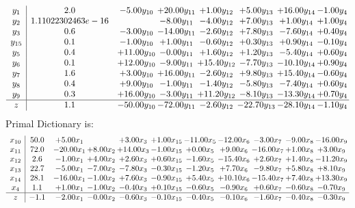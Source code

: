 \documentclass[9pt]{article}
\begin{document}
\[\begin{array}{c| c c@{\hskip 2pt} c@{\hskip 2pt} c@{\hskip 2pt} c@{\hskip 2pt} c@{\hskip 2pt} c@{\hskip 2pt} }
 y_{1}   &  2.0 & -5.00 y_{10} & + 20.00 y_{11} & +  1.00 y_{12} & +  5.00 y_{13} & + 16.00 y_{14} & -1.00 y_{4}\\
 y_{2}   &  1.11022302463e-16  &   & -8.00 y_{11} & -4.00 y_{12} & +  7.00 y_{13} & +  1.00 y_{14} & +  1.00 y_{4}\\
 y_{3}   &  0.6 & -3.00 y_{10} & -14.00 y_{11} & -2.60 y_{12} & +  7.80 y_{13} & -7.60 y_{14} & +  0.40 y_{4}\\
 y_{15}   &  0.1 & -1.00 y_{10} & +  1.00 y_{11} & -0.60 y_{12} & +  0.30 y_{13} & +  0.90 y_{14} & -0.10 y_{4}\\
 y_{5}   &  0.4 & + 11.00 y_{10} & -0.00 y_{11} & +  1.60 y_{12} & +  1.20 y_{13} & -5.40 y_{14} & +  0.60 y_{4}\\
 y_{6}   &  0.1 & + 12.00 y_{10} & -9.00 y_{11} & + 15.40 y_{12} & -7.70 y_{13} & -10.10 y_{14} & +  0.90 y_{4}\\
 y_{7}   &  1.6 & +  3.00 y_{10} & + 16.00 y_{11} & -2.60 y_{12} & +  9.80 y_{13} & + 15.40 y_{14} & -0.60 y_{4}\\
 y_{8}   &  0.4 & +  9.00 y_{10} & -1.00 y_{11} & -1.40 y_{12} & -5.80 y_{13} & -7.40 y_{14} & +  0.60 y_{4}\\
 y_{9}   &  0.3 & + 16.00 y_{10} & -3.00 y_{11} & + 11.20 y_{12} & -8.10 y_{13} & -13.30 y_{14} & +  0.70 y_{4}\\
\hline
z    &  1.1 & -50.00 y_{10} & -72.00 y_{11} & -2.60 y_{12} & -22.70 y_{13} & -28.10 y_{14} & -1.10 y_{4}\\
\end{array}\]
Primal Dictionary is:
\[\begin{array}{c| c c@{\hskip 2pt} c@{\hskip 2pt} c@{\hskip 2pt} c@{\hskip 2pt} c@{\hskip 2pt} c@{\hskip 2pt} c@{\hskip 2pt} c@{\hskip 2pt} c@{\hskip 2pt} }
 x_{10}   &  50.0 & +  5.00 x_{1} &   & +  3.00 x_{3} & +  1.00 x_{15} & -11.00 x_{5} & -12.00 x_{6} & -3.00 x_{7} & -9.00 x_{8} & -16.00 x_{9}\\
 x_{11}   &  72.0 & -20.00 x_{1} & +  8.00 x_{2} & + 14.00 x_{3} & -1.00 x_{15} & +  0.00 x_{5} & +  9.00 x_{6} & -16.00 x_{7} & +  1.00 x_{8} & +  3.00 x_{9}\\
 x_{12}   &  2.6 & -1.00 x_{1} & +  4.00 x_{2} & +  2.60 x_{3} & +  0.60 x_{15} & -1.60 x_{5} & -15.40 x_{6} & +  2.60 x_{7} & +  1.40 x_{8} & -11.20 x_{9}\\
 x_{13}   &  22.7 & -5.00 x_{1} & -7.00 x_{2} & -7.80 x_{3} & -0.30 x_{15} & -1.20 x_{5} & +  7.70 x_{6} & -9.80 x_{7} & +  5.80 x_{8} & +  8.10 x_{9}\\
 x_{14}   &  28.1 & -16.00 x_{1} & -1.00 x_{2} & +  7.60 x_{3} & -0.90 x_{15} & +  5.40 x_{5} & + 10.10 x_{6} & -15.40 x_{7} & +  7.40 x_{8} & + 13.30 x_{9}\\
 x_{4}   &  1.1 & +  1.00 x_{1} & -1.00 x_{2} & -0.40 x_{3} & +  0.10 x_{15} & -0.60 x_{5} & -0.90 x_{6} & +  0.60 x_{7} & -0.60 x_{8} & -0.70 x_{9}\\
\hline
z    &  -1.1 & -2.00 x_{1} & -0.00 x_{2} & -0.60 x_{3} & -0.10 x_{15} & -0.40 x_{5} & -0.10 x_{6} & -1.60 x_{7} & -0.40 x_{8} & -0.30 x_{9}\\
\end{array}\]
\end{document}
